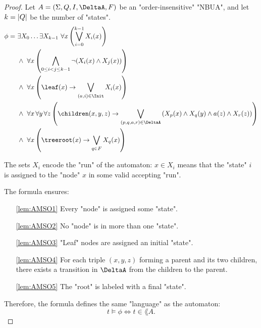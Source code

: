 \documentclass[a4paper,UKenglish,cleveref, autoref, thm-restate]{lipics-v2021}
\begin{document}
\begin{proof}\label{lem:Aut-to-MSO}
	Let $A = \NBUA$ be an "order-insensitive" "NBUA", and let $k = \left|Q\right|$ be the number of "states".
	\begin{align}
		\phi =\  & \exists X_0 \ldots \exists X_{k-1} \ \forall x \left( \bigvee_{i=0}^{k-1} X_i(x) \right) \label{lem:AMSO1}                                                                                     \\
		         & \land\ \forall x \left( \bigwedge_{0 \leq i < j \leq k-1} \lnot (X_i(x) \land X_j(x)) \right) \label{lem:AMSO2}                                                                                \\
		         & \land\ \forall x \left( \leaf(x) \rightarrow \bigvee_{(a,i) \in \Init} X_i(x) \right) \label{lem:AMSO3}                                                                                        \\
		         & \land\ \forall x\, \forall y\, \forall z \left(\children(x,y,z) \rightarrow \bigvee_{(p,q,a,r) \in \DeltaA} \left(X_p(x) \land X_q(y) \land a(z) \land X_r(z)\right) \right) \label{lem:AMSO4} \\
		         & \land\ \forall x \left( \treeroot(x) \rightarrow \bigvee_{q \in F} X_q(x) \right) \label{lem:AMSO5}
	\end{align}

	The sets $X_i$ encode the "run" of the automaton: $x \in X_i$ means that the "state" $i$ is assigned to the "node" $x$ in some valid accepting "run".

	The formula ensures:

	\begin{itemize}
		\item[\ref{lem:AMSO1}] Every "node" is assigned some "state".
		\item[\ref{lem:AMSO2}] No "node" is in more than one "state".
		\item[\ref{lem:AMSO3}] "Leaf" nodes are assigned an initial "state".
		\item[\ref{lem:AMSO4}] For each triple $(x,y,z)$ forming a parent and its two children,
		      there exists a transition in $\DeltaA$ from the children to the parent.
		\item[\ref{lem:AMSO5}] The "root" is labeled with a final "state".
	\end{itemize}

	Therefore, the formula defines the same "language" as the automaton:
	\[
		t \models \phi \iff t \in \lang A.
	\]
\end{proof}
\end{document}

